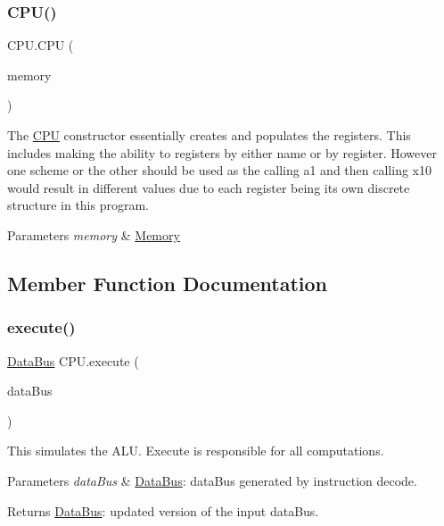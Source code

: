 \subsubsection{\texorpdfstring{C\+P\+U()}{CPU()}}
{\footnotesize\ttfamily C\+P\+U.\+C\+PU (\begin{DoxyParamCaption}\item[{\mbox{\hyperlink{class_memory}{Memory}}}]{memory }\end{DoxyParamCaption})\hspace{0.3cm}{\ttfamily [package]}}

The \mbox{\hyperlink{class_c_p_u}{C\+PU}} constructor essentially creates and populates the registers. This includes making the ability to registers by either name or by register. However one scheme or the other should be used as the calling a1 and then calling x10 would result in different values due to each register being its own discrete structure in this program.


\begin{DoxyParams}{Parameters}
{\em memory} & \mbox{\hyperlink{class_memory}{Memory}} \\
\hline
\end{DoxyParams}


\subsection{Member Function Documentation}
\mbox{\label{class_c_p_u_a53da2e36c38199794f20432b9eb558e1}} 
\subsubsection{\texorpdfstring{execute()}{execute()}}
{\footnotesize\ttfamily \mbox{\hyperlink{class_data_bus}{Data\+Bus}} C\+P\+U.\+execute (\begin{DoxyParamCaption}\item[{\mbox{\hyperlink{class_data_bus}{Data\+Bus}}}]{data\+Bus }\end{DoxyParamCaption})\hspace{0.3cm}{\ttfamily [private]}}

This simulates the A\+LU. Execute is responsible for all computations. 
\begin{DoxyParams}{Parameters}
{\em data\+Bus} & \mbox{\hyperlink{class_data_bus}{Data\+Bus}}\+: data\+Bus generated by instruction decode. \\
\hline
\end{DoxyParams}
\begin{DoxyReturn}{Returns}
\mbox{\hyperlink{class_data_bus}{Data\+Bus}}\+: updated version of the input data\+Bus. 
\end{DoxyReturn}
\mbox{\label{class_c_p_u_a5c034d51b86bf20154840beb0b67b85f}} 
